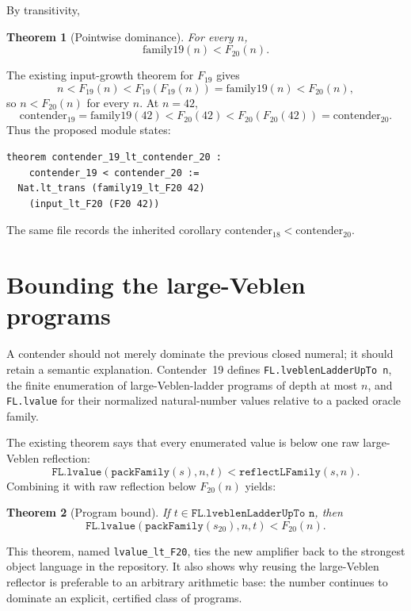\documentclass[11pt]{article}
\newtheorem{theorem}{Theorem}[section]
\theoremstyle{definition}
\theoremstyle{remark}
\newcommand{\code}[1]{\texttt{#1}}
\begin{document}
By transitivity,
\begin{theorem}[Pointwise dominance]
For every \(n\),
\[
\mathrm{family19}(n)<F_{20}(n).
\]
\end{theorem}

The existing input-growth theorem for \(F_{19}\) gives
\[
n<F_{19}(n)<F_{19}(F_{19}(n))=\mathrm{family19}(n)<F_{20}(n),
\]
so \(n<F_{20}(n)\) for every \(n\).  At \(n=42\),
\[
\mathrm{contender}_{19}=\mathrm{family19}(42)<F_{20}(42)
<F_{20}(F_{20}(42))=\mathrm{contender}_{20}.
\]
Thus the proposed module states:

\begin{lstlisting}
theorem contender_19_lt_contender_20 :
    contender_19 < contender_20 :=
  Nat.lt_trans (family19_lt_F20 42)
    (input_lt_F20 (F20 42))
\end{lstlisting}

The same file records the inherited corollary
\(\mathrm{contender}_{18}<\mathrm{contender}_{20}\).

\section{Bounding the large-Veblen programs}

A contender should not merely dominate the previous closed numeral; it should
retain a semantic explanation.  Contender~19 defines
\code{FL.lveblenLadderUpTo n}, the finite enumeration of large-Veblen-ladder
programs of depth at most \(n\), and \code{FL.lvalue} for their normalized
natural-number values relative to a packed oracle family.

The existing theorem says that every enumerated value is below one raw
large-Veblen reflection:
\[
\code{FL.lvalue}(\code{packFamily}(s),n,t)
<\code{reflectLFamily}(s,n).
\]
Combining it with raw reflection below \(F_{20}(n)\) yields:

\begin{theorem}[Program bound]
If \(t\in\code{FL.lveblenLadderUpTo n}\), then
\[
\code{FL.lvalue}(\code{packFamily}(s_{20}),n,t)<F_{20}(n).
\]
\end{theorem}

This theorem, named \code{lvalue\_lt\_F20}, ties the new amplifier back to the
strongest object language in the repository.  It also shows why reusing the
large-Veblen reflector is preferable to an arbitrary arithmetic base: the
number continues to dominate an explicit, certified class of programs.
\end{document}
